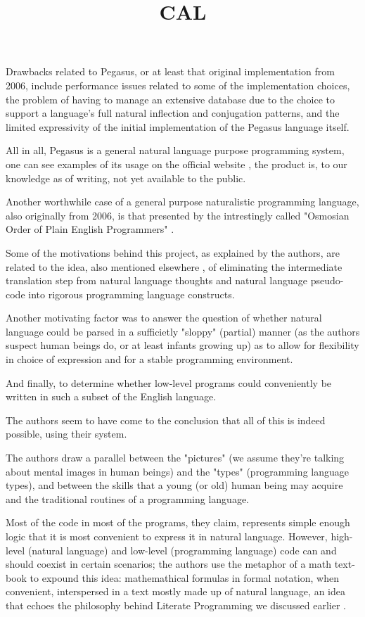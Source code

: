 Drawbacks related to Pegasus, or at least that original implementation from 2006, include performance issues related to some of the implementation choices, the problem of having to manage an extensive database due to the choice to support a language's full natural inflection and conjugation patterns, and the limited expressivity of the initial implementation of the Pegasus language itself.

All in all, Pegasus is a general natural language purpose programming system, one can see examples of its usage on the official website \cite{pegasuswebsite}, the product is, to our knowledge as of writing, not yet available to the public.


\title{CAL}

Another worthwhile case of a general purpose naturalistic programming language, also originally from 2006, is that presented by the intrestingly called "Osmosian Order of Plain English Programmers" \cite{osmosianblog}.

Some of the motivations behind this project, as explained by the authors, are related to the idea, also mentioned elsewhere \cite{knoll2006pegasus}, of eliminating the intermediate translation step from natural language thoughts and natural language pseudo-code into rigorous programming language constructs.

Another motivating factor was to answer the question of whether natural language could be parsed in a sufficietly "sloppy" (partial) manner (as the authors suspect human beings do, or at least infants growing up) as to allow for flexibility in choice of expression and for a stable programming environment.

And finally, to determine whether low-level programs could conveniently be written in such a subset of the English language.

The authors seem to have come to the conclusion that all of this is indeed possible, using their system.

The authors draw a parallel between the "pictures" (we assume they're talking about mental images in human beings) and the "types" (programming language types), and between the skills that a young (or old) human being may acquire and the traditional routines of a programming language.

Most of the code in most of the programs, they claim, represents simple enough logic that it is most convenient to express it in natural language. However, high-level (natural language) and low-level (programming language) code can and should coexist in certain scenarios; the authors use the metaphor of a math text-book to expound this idea: mathemathical formulas in formal notation, when convenient, interspersed in a text mostly made up of natural language, an idea that echoes the philosophy behind Literate Programming we discussed earlier \cite{knuth1984literate}.

